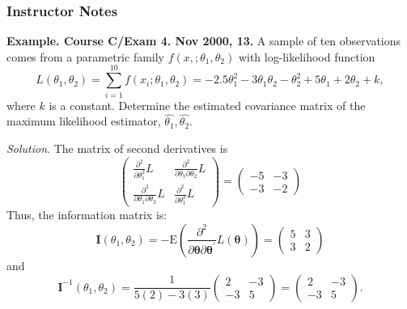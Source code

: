 \documentclass{beamer}
\begin{document}
\begin{frame}[shrink=2]
\frametitle{Instructor Notes}
\noindent\textbf{Example. Course C/Exam 4. Nov 2000, 13.} A sample of ten observations comes from a
parametric family $f(x,; \theta_1, \theta_2)$ with log-likelihood function
\begin{equation*}
L(\theta_1, \theta_2)= \sum_{i=1}^{10} f(x_i; \theta_1, \theta_2) = -2.5 \theta_1^2 - 3
\theta_1 \theta_2 - \theta_2^2 + 5 \theta_1 + 2 \theta_2 + k,
\end{equation*}
where $k$ is a constant. Determine the estimated covariance matrix of the maximum likelihood
estimator, $\hat{\theta_1}, \hat{\theta_2} $.

\textit{Solution}. The matrix of second derivatives is
\begin{equation*}
\left(
\begin{array}{cc}
  \frac{ \partial ^2}{\partial \theta_1 ^2 } L & \frac{ \partial ^2}{\partial \theta_1 \partial \theta_2 } L  \\
  \frac{ \partial ^2}{\partial \theta_1 \partial \theta_2 } L & \frac{ \partial ^2}{\partial \theta_1 ^2 } L
\end{array} \right) =
\left(
\begin{array}{cc}
  -5 & -3  \\
  -3 & -2
\end{array} \right)
\end{equation*}
Thus, the information matrix is:
\begin{equation*}
\mathbf{I}(\theta_1, \theta_2) = -\mathrm{E} \left( \frac{ \partial^2}{\partial \boldsymbol \theta
\partial \boldsymbol \theta^{\prime}} L(\boldsymbol \theta) \right) = \left(
\begin{array}{cc}
  5 & 3  \\
  3 & 2
\end{array} \right)
\end{equation*}
and
\begin{equation*}
\mathbf{I}^{-1}(\theta_1, \theta_2) = \frac{1}{5(2) - 3(3)}\left(
\begin{array}{cc}
  2 & -3  \\
  -3 & 5
\end{array} \right) = \left(
\begin{array}{cc}
  2 & -3  \\
  -3 & 5
\end{array} \right) .
\end{equation*}
\end{frame}
\end{document}
